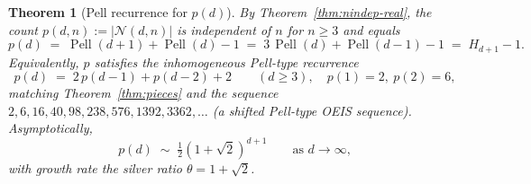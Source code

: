 \documentclass{amsart}
\newtheorem{theorem}{Theorem}[section]
\theoremstyle{definition}
\theoremstyle{remark}
\DeclareMathOperator{\Pell}{Pell}
\begin{document}
\begin{theorem}[Pell recurrence for $p(d)$]
\label{thm:pell}
By Theorem~\ref{thm:nindep-real}, the count
$p(d, n) := |\mathcal{N}(d, n)|$ is independent of $n$ for $n \ge 3$
and equals
\begin{equation}\label{eq:p-closed}
  p(d) \;=\; \Pell(d+1) + \Pell(d) - 1
       \;=\; 3\,\Pell(d) + \Pell(d-1) - 1
       \;=\; H_{d+1} - 1.
\end{equation}
Equivalently, $p$ satisfies the inhomogeneous Pell-type recurrence
\begin{equation}\label{eq:p-recurrence}
  p(d) \;=\; 2\,p(d-1) + p(d-2) + 2
  \qquad (d \ge 3),
  \quad p(1) = 2,\ p(2) = 6,
\end{equation}
matching Theorem~\ref{thm:pieces} and the
sequence $2, 6, 16, 40, 98, 238, 576, 1392, 3362, \ldots$
\textup{(}a shifted Pell-type OEIS sequence\textup{)}.  Asymptotically,
\[
  p(d) \;\sim\; \tfrac{1}{2}(1 + \sqrt 2)^{d+1}
  \qquad \text{as } d \to \infty,
\]
with growth rate the silver ratio $\theta = 1 + \sqrt 2$.
\end{theorem}
\end{document}
